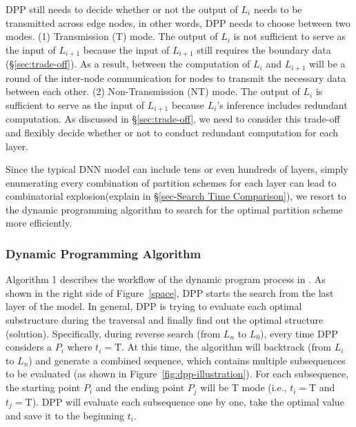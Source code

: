  DPP still needs to decide whether or not the output of $L_i$ needs to be transmitted across edge nodes, in other words, DPP needs to choose between two modes. (1) Transmission (T) mode. The output of $L_i$ is not sufficient to serve as the input of $L_{i+1}$ because the input of $L_{i+1}$ still requires the boundary data (\S\ref{sec:trade-off}). As a result, between the computation of $L_{i}$ and $L_{i+1}$ will be a round of the inter-node communication for nodes to transmit the necessary data between each other. (2) Non-Transmission (NT) mode. The output of $L_i$ is sufficient to serve as the input of $L_{i+1}$ because $L_i$'s inference includes redundant computation. As discussed in \S\ref{sec:trade-off}, we need to consider this trade-off and flexibly decide whether or not to conduct redundant computation for each layer.

Since the typical DNN model can include tens or even hundreds of layers, simply enumerating every combination of partition schemes for each layer can lead to combinatorial explosion(explain in \S\ref{sec-Search Time Comparison}), we resort to the dynamic programming algorithm to search for the optimal partition scheme more efficiently.


\subsubsection{Dynamic Programming Algorithm}
\label{sec:optimal-eval}

Algorithm 1 describes the workflow of the dynamic program process in \sysname. As shown in the right side of Figure~\ref{space}, DPP starts the search from the last layer of the model. In general, DPP is trying to evaluate each optimal substructure during the traversal and finally find out the optimal structure (solution). Specifically, during reverse search (from $L_n$ to $L_0$), every time DPP considers a $P_i$ where $t_i=\text{T}$. At this time, the algorithm will backtrack (from $L_i$ to $L_n$) and generate a combined sequence, which contains multiple subsequences to be evaluated (as shown in Figure~\ref{fig:dpp-illustration}). For each subsequence, the starting point $P_{i}$ and the ending point $P_{j}$ will be T mode (i.e., $t_i=\text{T}$ and $t_j=\text{T}$). DPP will evaluate each subsequence one by one, take the optimal value and save it to the beginning $t_i$.


